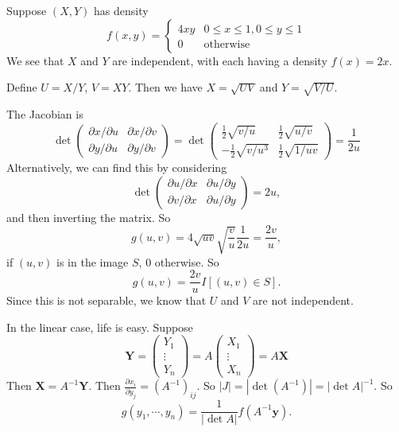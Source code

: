 \documentclass[a4paper]{article}
\begin{document}
\begin{eg}
  Suppose $(X, Y)$ has density
  \[
    f(x, y) =
    \begin{cases}
      4xy & 0 \leq x \leq 1, 0\leq y \leq 1\\
      0 & \text{otherwise}
    \end{cases}
  \]
  We see that $X$ and $Y$ are independent, with each having a density $f(x) = 2x$.

  Define $U = X/Y$, $V = XY$. Then we have $X = \sqrt{UV}$ and $Y = \sqrt{V/U}$.

  The Jacobian is
  \[
    \det
    \begin{pmatrix}
      \partial x/\partial u & \partial x/\partial v\\
      \partial y/\partial u & \partial y/\partial v
    \end{pmatrix}
    =
    \det
    \begin{pmatrix}
      \frac{1}{2}\sqrt{v/u} & \frac{1}{2}\sqrt{u/v}\\
      -\frac{1}{2}\sqrt{v/u^3} & \frac{1}{2}\sqrt{1/uv}
    \end{pmatrix}
    = \frac{1}{2u}
  \]
  Alternatively, we can find this by considering
  \[
    \det
    \begin{pmatrix}
      \partial u/\partial x & \partial u/\partial y\\
      \partial v/\partial x & \partial u/\partial y
    \end{pmatrix} = 2u,
  \]
  and then inverting the matrix. So
  \[
    g(u, v) = 4\sqrt{uv}\sqrt{\frac{v}{u}}\frac{1}{2u} = \frac{2v}{u},
  \]
  if $(u, v)$ is in the image $S$, $0$ otherwise. So
  \[
    g(u, v) = \frac{2v}{u}I[(u, v)\in S].
  \]
  Since this is not separable, we know that $U$ and $V$ are not independent.
\end{eg}

In the linear case, life is easy. Suppose
\[
  \mathbf{Y} = \begin{pmatrix}
    Y_1\\
    \vdots\\
    Y_n
  \end{pmatrix} = A
  \begin{pmatrix}
    X_1\\
    \vdots\\
    X_n
  \end{pmatrix} = A\mathbf{X}
\]
Then $\mathbf{X} = A^{-1}\mathbf{Y}$. Then $\frac{\partial x_i}{\partial y_j} = (A^{-1})_{ij}$. So $|J| = |\det(A^{-1})| = |\det A|^{-1}$. So
\[
  g(y_1, \cdots, y_n) = \frac{1}{|\det A|}f(A^{-1}\mathbf{y}).
\]
\end{document}
